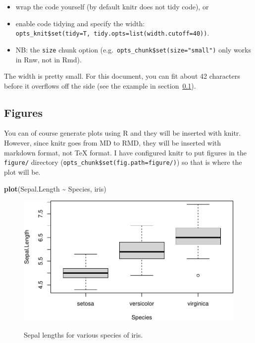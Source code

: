 \documentclass[a4paper,conference]{IEEEtran}
\makeatletter
\newenvironment{Shaded}{\begin{snugshade}}{\end{snugshade}}
\newcommand{\FunctionTok}[1]{\textcolor[rgb]{0.13,0.29,0.53}{\textbf{#1}}}
\newcommand{\NormalTok}[1]{#1}
\newcommand{\SpecialCharTok}[1]{\textcolor[rgb]{0.81,0.36,0.00}{\textbf{#1}}}
\def\maxwidth{\ifdim\Gin@nat@width>\linewidth\linewidth\else\Gin@nat@width\fi}
\def\maxheight{\ifdim\Gin@nat@height>\textheight\textheight\else\Gin@nat@height\fi}
\let\tightlist\relax %
\def\maxwidth{\ifdim\Gin@nat@width>\linewidth\linewidth\else\Gin@nat@width\fi}
\def\maxheight{\ifdim\Gin@nat@height>\textheight\textheight\else\Gin@nat@height\fi}
\def\pandocbounded#1{%
  \begin{adjustbox}{width=\maxwidth,height=\maxheight,keepaspectratio}#1\end{adjustbox}}
\makeatother
\begin{document}
\begin{itemize}
\tightlist
\item
  wrap the code yourself (by default knitr does not tidy code), or
\item
  enable code tidying and specify the width:
  \texttt{opts\_knit\$set(tidy=T,\ tidy.opts=list(width.cutoff=40))}.
\item
  NB: the \texttt{size} chunk option
  (e.g.~\texttt{opts\_chunk\$set(size="small")} only works in Rnw, not
  in Rmd).
\end{itemize}

The width is pretty small. For this document, you can fit about 42
characters before it overflows off the side (see the example in
section~\ref{sec:figures}).

\subsection{Figures}\label{sec:figures}

You can of course generate plots using R and they will be inserted with
knitr. However, since knitr goes from MD to RMD, they will be inserted
with markdown format, not TeX format. I have configured knitr to put
figures in the \texttt{figure/} directory
(\texttt{opts\_chunk\$set(fig.path=\textquotesingle{}figure/\textquotesingle{})})
so that is where the plot will be.

\begin{Shaded}
\begin{Highlighting}[]
\FunctionTok{plot}\NormalTok{(Sepal.Length }\SpecialCharTok{\textasciitilde{}}\NormalTok{ Species, iris)}
\end{Highlighting}
\end{Shaded}

\begin{figure}
\centering
\pandocbounded{\includegraphics[keepaspectratio,alt={Sepal lengths for various species of iris.}]{figure/iris.plot-1.pdf}}
\caption{Sepal lengths for various species of iris.\label{fig:iris}}
\end{figure}
\end{document}

